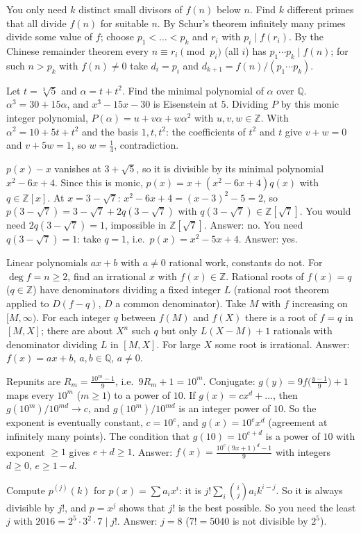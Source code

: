 \documentclass[11pt,a4paper]{article}
\begin{document}
 You only need $k$ distinct small divisors of $f(n)$ below $n$. Find $k$ different primes that all divide $f(n)$ for suitable $n$.
 By Schur's theorem infinitely many primes divide some value of $f$; choose $p_1<\dots<p_k$ and $r_i$ with $p_i\mid f(r_i)$.
 By the Chinese remainder theorem every $n\equiv r_i\pmod{p_i}$ (all $i$) has $p_1\cdots p_k\mid f(n)$; for such $n>p_k$ with $f(n)\ne0$ take $d_i=p_i$ and $d_{k+1}=f(n)/(p_1\cdots p_k)$.

 Let $t=\sqrt[3]5$ and $\alpha=t+t^2$. Find the minimal polynomial of $\alpha$ over $\mathbb{Q}$.
 $\alpha^3=30+15\alpha$, and $x^3-15x-30$ is Eisenstein at $5$. Dividing $P$ by this monic integer polynomial, $P(\alpha)=u+v\alpha+w\alpha^2$ with $u,v,w\in\mathbb{Z}$.
 With $\alpha^2=10+5t+t^2$ and the basis $1,t,t^2$: the coefficients of $t^2$ and $t$ give $v+w=0$ and $v+5w=1$, so $w=\frac14$, contradiction.

 $p(x)-x$ vanishes at $3+\sqrt5$, so it is divisible by its minimal polynomial $x^2-6x+4$. Since this is monic, $p(x)=x+(x^2-6x+4)q(x)$ with $q\in\mathbb{Z}[x]$.
 At $x=3-\sqrt7$: $x^2-6x+4=(x-3)^2-5=2$, so $p(3-\sqrt7)=3-\sqrt7+2q(3-\sqrt7)$ with $q(3-\sqrt7)\in\mathbb{Z}[\sqrt7]$.
 You would need $2q(3-\sqrt7)=1$, impossible in $\mathbb{Z}[\sqrt7]$. Answer: no.
 You need $q(3-\sqrt7)=1$: take $q=1$, i.e.\ $p(x)=x^2-5x+4$. Answer: yes.

 Linear polynomials $ax+b$ with $a\ne0$ rational work, constants do not. For $\deg f=n\ge2$, find an irrational $x$ with $f(x)\in\mathbb{Z}$.
 Rational roots of $f(x)=q$ ($q\in\mathbb{Z}$) have denominators dividing a fixed integer $L$ (rational root theorem applied to $D(f-q)$, $D$ a common denominator).
 Take $M$ with $f$ increasing on $[M,\infty)$. For each integer $q$ between $f(M)$ and $f(X)$ there is a root of $f=q$ in $[M,X]$; there are about $X^n$ such $q$ but only $L(X-M)+1$ rationals with denominator dividing $L$ in $[M,X]$. For large $X$ some root is irrational. Answer: $f(x)=ax+b$, $a,b\in\mathbb{Q}$, $a\ne0$.

 Repunits are $R_m=\frac{10^m-1}9$, i.e.\ $9R_m+1=10^m$. Conjugate: $g(y)=9f\bigl(\frac{y-1}9\bigr)+1$ maps every $10^m$ ($m\ge1$) to a power of $10$.
 If $g(x)=cx^d+\dots$, then $g(10^m)/10^{md}\to c$, and $g(10^m)/10^{md}$ is an integer power of $10$. So the exponent is eventually constant, $c=10^{e}$, and $g(x)=10^ex^d$ (agreement at infinitely many points).
 The condition that $g(10)=10^{e+d}$ is a power of $10$ with exponent $\ge1$ gives $e+d\ge1$. Answer: $f(x)=\frac{10^e(9x+1)^d-1}{9}$ with integers $d\ge0$, $e\ge1-d$.

 Compute $p^{(j)}(k)$ for $p(x)=\sum a_ix^i$: it is $j!\sum_i\binom ija_ik^{i-j}$. So it is always divisible by $j!$, and $p=x^j$ shows that $j!$ is the best possible.
 So you need the least $j$ with $2016=2^5\cdot3^2\cdot7\mid j!$. Answer: $j=8$ ($7!=5040$ is not divisible by $2^5$).
\end{document}
